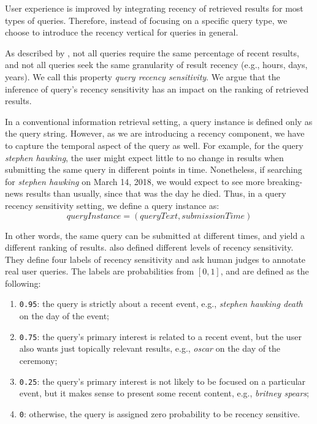User experience is improved by integrating recency of retrieved results for most types of queries. Therefore, instead of focusing on a specific query type, we choose to introduce the recency vertical for queries in general.

As described by \cite{styskin2011recency}, not all queries require the same percentage of recent results, and not all queries seek the same granularity of result recency (e.g., hours, days, years). We call this property \textit{query recency sensitivity}. We argue that the inference of query's recency sensitivity has an impact on the ranking of retrieved results.

In a conventional information retrieval setting, a query instance is defined only as the query string. However, as we are introducing a recency component, we have to capture the temporal aspect of the query as well. For example, for the query \textit{stephen hawking}, the user might expect little to no change in results when submitting the same query in different points in time. Nonetheless, if searching for \textit{stephen hawking} on March 14, 2018, we would expect to see more breaking-news results than usually, since that was the day he died. Thus, in a query recency sensitivity setting, we define a query instance as:
\[ queryInstance = (queryText, submissionTime) \]

\noindent In other words, the same query can be submitted at different times, and yield a different ranking of results. \citet{styskin2011recency} also defined different levels of recency sensitivity. They define four labels of recency sensitivity and ask human judges to annotate real user queries. The labels are probabilities from $[0,1]$, and are defined as the following:
\begin{enumerate}
	\item \texttt{0.95}: the query is strictly about a recent event, e.g., \textit{stephen hawking death} on the day of the event;
    \item \texttt{0.75}: the query's primary interest is related to a recent event, but the user also wants just topically relevant results, e.g., \textit{oscar} on the day of the ceremony;
    \item \texttt{0.25}: the query’s primary interest is not likely to be focused on a particular event, but it makes sense to present some recent content, e.g., \textit{britney spears};
    \item \texttt{0}: otherwise, the query is assigned zero probability to be recency sensitive.
\end{enumerate}

